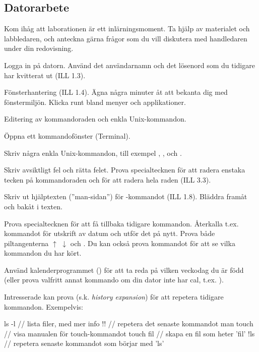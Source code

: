 \subsection*{Datorarbete}
Kom ihåg att laborationen är ett inlärningsmoment. Ta hjälp av materialet och labbledaren, och anteckna gärna frågor som du vill diskutera med handledaren under din redovisning.
\begin{Datorarbete}
	\item Logga in på datorn. Använd det användarnamn och det lösenord som du tidigare har kvitterat ut (ILL 1.3).
	\item Fönsterhantering (ILL 1.4). Ägna några minuter åt att bekanta dig med fönstermiljön. Klicka runt bland menyer och applikationer.
	\item Editering av kommandoraden och enkla Unix-kommandon.

	\begin{Deluppgifter}
		\item Öppna ett kommandofönster (Terminal).
		\item Skriv några enkla Unix-kommandon, till exempel , ,  och .
		\item Skriv avsiktligt fel och rätta felet. Prova specialtecknen för att radera enstaka tecken på kommandoraden och för att radera hela raden (ILL 3.3).
		\item Skriv ut hjälptexten (''man-sidan'') för -kommandot (ILL 1.8). Bläddra framåt och bakåt i texten.
		\item Prova specialtecknen för att få tillbaka tidigare kommandon. Återkalla t.ex. kommandot för utskrift av datum och utför det på nytt. Prova både piltangenterna $\uparrow$ $\downarrow$ och . Du kan också prova kommandot  för att se vilka kommandon du har kört.
		\item Använd kalenderprogrammet () för att ta reda på vilken veckodag du är född (eller prova valfritt annat kommando om din dator inte har cal, t.ex. ).
		\item Intresserade kan prova \code{!} (s.k. \emph{history expansion}) för att repetera tidigare kommandon. Exempelvis:
		\begin{Code}
			ls -l      // lista filer, med mer info
			!!         // repetera det senaste kommandot
			man touch  // visa manualen för touch-kommandot
			touch fil  // skapa en fil som heter 'fil'
			!ls        // repetera senaste kommandot som börjar med 'ls'
		\end{Code}
	\end{Deluppgifter}


\end{Datorarbete}
